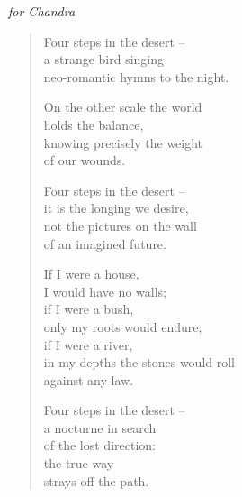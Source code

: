 

\hspace{2em}\emph{for Chandra}

\begin{verse}
Four steps in the desert --\\
a strange bird singing\\
neo-romantic hymns to the night.

On the other scale the world\\
holds the balance,\\
knowing precisely the weight\\
of our wounds.

Four steps in the desert --\\
it is the longing we desire,\\
not the pictures on the wall\\
of an imagined future.

If I were a house,\\
I would have no walls;\\
if I were a bush,\\
only my roots would endure;\\
if I were a river,\\
in my depths the stones would roll\\
against any law.

Four steps in the desert --\\
a nocturne in search\\
of the lost direction:\\
the true way\\
strays off the path.
\end{verse}
